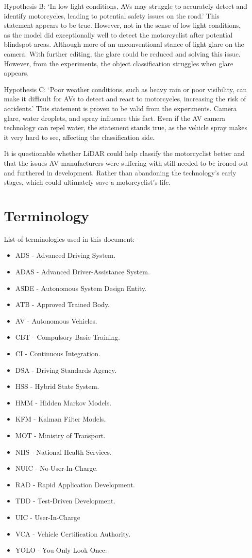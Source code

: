 \documentclass[12pt]{report} %
\begin{document}
	Hypothesis B: `In low light conditions, AVs may struggle to accurately detect and identify motorcycles, leading to potential safety issues on the road.' This statement appears to be true. However, not in the sense of low light conditions, as the model did exceptionally well to detect the motorcyclist after potential blindspot areas. Although more of an unconventional stance of light glare on the camera. With further editing, the glare could be reduced and solving this issue. However, from the experiments, the object classification struggles when glare appears.

	Hypothesis C: `Poor weather conditions, such as heavy rain or poor visibility, can make it difficult for AVs to detect and react to motorcycles, increasing the risk of accidents.' This statement is proven to be valid from the experiments. Camera glare, water droplets, and spray influence this fact. Even if the AV camera technology can repel water, the statement stands true, as the vehicle spray makes it very hard to see, affecting the classification side. 

	It is questionable whether LiDAR could help classify the motorcyclist better and that the issues AV manufacturers were suffering with still needed to be ironed out and furthered in development. Rather than abandoning the technology's early stages, which could ultimately save a motorcyclist's life.

\chapter*{Terminology}
List of terminologies used in this document:-
\begin{itemize}
	\item ADS - Advanced Driving System. 
	\item ADAS - Advanced Driver-Assistance System.
	\item ASDE - Autonomous System Design Entity.
	\item ATB - Approved Trained Body.
	\item AV - Autonomous Vehicles.
	\item CBT - Compulsory Basic Training.
	\item CI - Continuous Integration.
	\item DSA - Driving Standards Agency.
	\item HSS - Hybrid State System.
	\item HMM - Hidden Markov Models.
	\item KFM - Kalman Filter Models.
	\item MOT - Ministry of Transport.
	\item NHS - National Health Services.
	\item NUIC - No-User-In-Charge.
	\item RAD - Rapid Application Development.
	\item TDD - Test-Driven Development.
	\item UIC - User-In-Charge
	\item VCA - Vehicle Certification Authority.
	\item YOLO - You Only Look Once.
\end{itemize}
  
\end{document}

